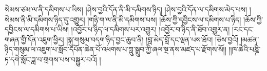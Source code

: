 སེམས་ཙམ་ལ་ནི་དམིགས་པ་ཡིས། །ཤེས་བྱའི་དོན་ནི་མི་དམིགས་ཉིད། །ཤེས་བྱའི་དོན་ལ་དམིགས་མེད་པས། །སེམས་ནི་མི་དམིགས་ཉིད་དུ་འགྱུར། །གཉི་ག་ལ་ནི་མི་དམིགས་པས། །ཆོས་ཀྱི་དབྱིངས་ལ་དམིགས་པ་ཉིད། །ཆོས་ཀྱི་དབྱིངས་ལ་དམིགས་པ་ཡིས། །འབྱོར་པ་ཉིད་ལ་དམིགས་པར་འགྱུར། །འབྱོར་བ་ཉིད་ནི་ཐོབ་འགྱུར་ན། །རང་དང་གཞན་གྱི་དོན་འཇུག་ཕྱིར། །སྐུ་གསུམ་བདག་ཉིད་བྱང་ཆུབ་ནི། །བླ་མེད་བློ་དང་ལྡན་པས་ཐོབ། །ཅེས་བྱའོ། །མཚན་ཉིད་གསུམ་ལ་འཇུག་པ་སློབ་དཔོན་ཆེན་པོ་འཕགས་པ་ཀླུ་སྒྲུབ་ཀྱི་ཞལ་སྔ་ནས་མཛད་པ་རྫོགས་སོ།། །།ཁ་ཆེའི་པཎྜི་ཏ་དགེ་སློང་ཟླ་བ་གྲགས་པས་བསྒྱུར་བའོ། ། 